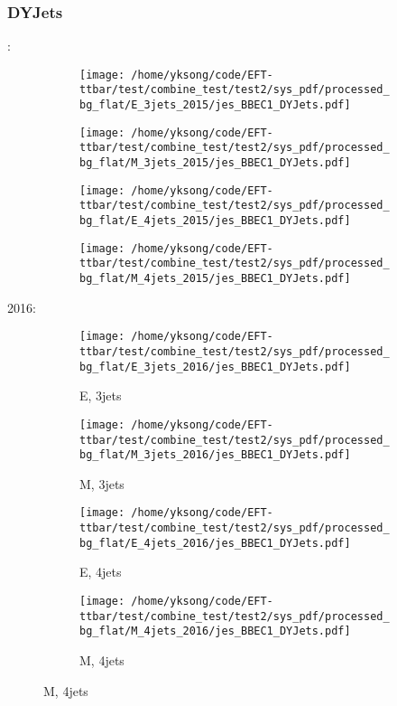 \documentclass{beamer}
\begin{document}
\begin{frame}
\frametitle{DYJets}
\fontsize{5}{1}:
\begin{figure}
\centering
\begin{subfigure}[b]{0.24\textwidth}
\texttt{[image: /home/yksong/code/EFT-ttbar/test/combine\_test/test2/sys\_pdf/processed\_bg\_flat/E\_3jets\_2015/jes\_BBEC1\_DYJets.pdf]}
\end{subfigure}
\begin{subfigure}[b]{0.24\textwidth}
\texttt{[image: /home/yksong/code/EFT-ttbar/test/combine\_test/test2/sys\_pdf/processed\_bg\_flat/M\_3jets\_2015/jes\_BBEC1\_DYJets.pdf]}
\end{subfigure}
\begin{subfigure}[b]{0.24\textwidth}
\texttt{[image: /home/yksong/code/EFT-ttbar/test/combine\_test/test2/sys\_pdf/processed\_bg\_flat/E\_4jets\_2015/jes\_BBEC1\_DYJets.pdf]}
\end{subfigure}
\begin{subfigure}[b]{0.24\textwidth}
\texttt{[image: /home/yksong/code/EFT-ttbar/test/combine\_test/test2/sys\_pdf/processed\_bg\_flat/M\_4jets\_2015/jes\_BBEC1\_DYJets.pdf]}
\end{subfigure}
\end{figure}
2016:
\begin{figure}
\centering
\begin{subfigure}[b]{0.24\textwidth}
\texttt{[image: /home/yksong/code/EFT-ttbar/test/combine\_test/test2/sys\_pdf/processed\_bg\_flat/E\_3jets\_2016/jes\_BBEC1\_DYJets.pdf]}
\captionsetup{font=tiny}
\caption{E, 3jets}
\end{subfigure}
\begin{subfigure}[b]{0.24\textwidth}
\texttt{[image: /home/yksong/code/EFT-ttbar/test/combine\_test/test2/sys\_pdf/processed\_bg\_flat/M\_3jets\_2016/jes\_BBEC1\_DYJets.pdf]}
\captionsetup{font=tiny}
\caption{M, 3jets}
\end{subfigure}
\begin{subfigure}[b]{0.24\textwidth}
\texttt{[image: /home/yksong/code/EFT-ttbar/test/combine\_test/test2/sys\_pdf/processed\_bg\_flat/E\_4jets\_2016/jes\_BBEC1\_DYJets.pdf]}
\captionsetup{font=tiny}
\caption{E, 4jets}
\end{subfigure}
\begin{subfigure}[b]{0.24\textwidth}
\texttt{[image: /home/yksong/code/EFT-ttbar/test/combine\_test/test2/sys\_pdf/processed\_bg\_flat/M\_4jets\_2016/jes\_BBEC1\_DYJets.pdf]}
\captionsetup{font=tiny}
\caption{M, 4jets}
\end{subfigure}
\end{figure}
\end{frame}
\end{document}
